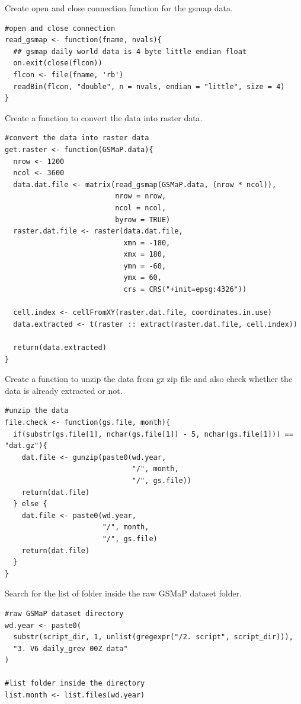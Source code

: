 \documentclass[12pt, a4paper]{article}
\begin{document}
\vskip 0.5cm
\noindent
Create open and close connection function for the gsmap data.

\begin{lstlisting}
#open and close connection
read_gsmap <- function(fname, nvals){
  ## gsmap daily world data is 4 byte little endian float
  on.exit(close(flcon))
  flcon <- file(fname, 'rb')
  readBin(flcon, "double", n = nvals, endian = "little", size = 4)
}
\end{lstlisting}

\vskip 0.5cm
\noindent
Create a function to convert the data into raster data.

\begin{lstlisting}
#convert the data into raster data
get.raster <- function(GSMaP.data){
  nrow <- 1200
  ncol <- 3600
  data.dat.file <- matrix(read_gsmap(GSMaP.data, (nrow * ncol)),
                          nrow = nrow,
                          ncol = ncol,
                          byrow = TRUE)
  raster.dat.file <- raster(data.dat.file,
                            xmn = -180,
                            xmx = 180,
                            ymn = -60,
                            ymx = 60,
                            crs = CRS("+init=epsg:4326"))
  
  cell.index <- cellFromXY(raster.dat.file, coordinates.in.use)
  data.extracted <- t(raster :: extract(raster.dat.file, cell.index))
  
  return(data.extracted)
}
\end{lstlisting}

\vskip 0.5cm
\noindent
Create a function to unzip the data from gz zip file and also check whether the data is already extracted or not.

\begin{lstlisting}
#unzip the data
file.check <- function(gs.file, month){
  if(substr(gs.file[1], nchar(gs.file[1]) - 5, nchar(gs.file[1])) == "dat.gz"){
    dat.file <- gunzip(paste0(wd.year,
                              "/", month,
                              "/", gs.file))
    return(dat.file)
  } else {
    dat.file <- paste0(wd.year,
                       "/", month,
                       "/", gs.file)
    return(dat.file)
  }
}
\end{lstlisting}

\vskip 0.5cm
\noindent
Search for the list of folder inside the raw GSMaP dataset folder.

\begin{lstlisting}
#raw GSMaP dataset directory
wd.year <- paste0(
  substr(script_dir, 1, unlist(gregexpr("/2. script", script_dir))),
  "3. V6 daily_grev 00Z data"
)

#list folder inside the directory
list.month <- list.files(wd.year)
\end{lstlisting}
\end{document}
